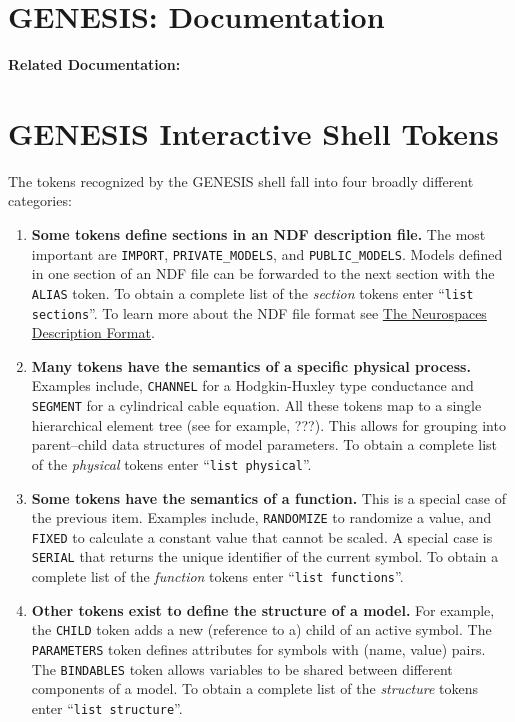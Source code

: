 \documentclass[12pt]{article}
\begin{document}
\section*{GENESIS: Documentation}

{\bf Related Documentation:}

\section*{GENESIS Interactive Shell Tokens}

The tokens recognized by the GENESIS shell fall into four broadly different categories:

\begin{enumerate}

\item {\bf Some tokens define sections in an NDF description file.} The most important are {\tt IMPORT}, {\tt PRIVATE\_MODELS}, and {\tt PUBLIC\_MODELS}. Models defined in one section of an NDF file can be forwarded to the next section with the {\tt ALIAS} token. To obtain a complete list of the {\it section} tokens enter ``{\tt list sections}''. To learn more about the NDF file format see \href{../ndf-file-format/ndf-file-format.tex}{The Neurospaces Description Format}.

\item {\bf Many tokens have the semantics of a specific physical process.} Examples include, {\tt CHANNEL} for a Hodgkin-Huxley type conductance and {\tt SEGMENT} for a cylindrical cable equation. All these tokens map to a single hierarchical element tree (see for example, ???). This allows for grouping into parent--child data structures of model parameters. To obtain a complete list of the {\it physical} tokens enter ``{\tt list physical}''.

\item {\bf Some tokens have the semantics of a function.} This is a special case of the previous item. Examples include, {\tt RANDOMIZE} to randomize a value, and {\tt FIXED} to calculate a constant value that cannot be scaled. A special case is {\tt SERIAL} that returns the unique identifier  of the current symbol.  To obtain a complete list of the {\it  function} tokens enter ``{\tt list functions}''.

\item {\bf Other tokens exist to define the structure of a model.} For example, the {\tt CHILD} token adds a new (reference to a) child of an active symbol. The {\tt PARAMETERS} token defines attributes for symbols with (name, value) pairs. The {\tt BINDABLES} token allows variables to be shared between different components of a model. To obtain a complete list of the {\it structure} tokens enter ``{\tt list structure}''.

\end{enumerate}
\end{document}
